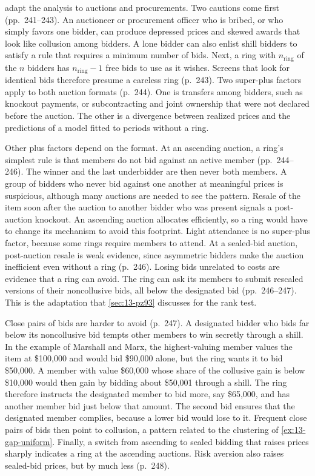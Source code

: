 \citet[ch.~12]{MarshallMarx2012} adapt the analysis to auctions and procurements. Two cautions come first
(pp.~241--243). An auctioneer or procurement officer who is bribed, or who simply favors one bidder, can produce
depressed prices and skewed awards that look like collusion among bidders. A lone bidder can also enlist shill
bidders to satisfy a rule that requires a minimum number of bids. Next, a ring with $n_{\mathrm{ring}}$ of the $n$
bidders has $n_{\mathrm{ring}} - 1$ free bids to use as it wishes. Screens that look for identical bids therefore presume a careless ring
(p.~243). Two super-plus factors apply to both auction formats (p.~244). One is transfers among bidders, such as
knockout payments, or subcontracting and joint ownership that were not declared before the auction. The other is a
divergence between realized prices and the predictions of a model fitted to periods without a ring.

Other plus factors depend on the format. At an ascending auction, a ring's simplest rule is that members do not bid
against an active member (pp.~244--246). The winner and the last underbidder are then never both members. A group of
bidders who never bid against one another at meaningful prices is suspicious, although many auctions are needed to
see the pattern. Resale of the item soon after the auction to another bidder who was present signals a post-auction
knockout. An ascending auction allocates efficiently, so a ring would have to change its mechanism to avoid this
footprint. Light attendance is no super-plus factor, because some rings require members to attend. At a
sealed-bid auction, post-auction resale is weak evidence, since asymmetric bidders make the auction inefficient
even without a ring (p.~246). Losing bids unrelated to costs are evidence that a ring can avoid. The ring can ask
its members to submit rescaled versions of their noncollusive bids, all below the designated bid (pp.~246--247).
This is the adaptation that \cref{sec:13-pz93} discusses for the rank test.

Close pairs of bids are harder to avoid (p.~247). A designated bidder who bids far below its noncollusive bid tempts
other members to win secretly through a shill. In the example of Marshall and Marx, the highest-valuing member
values the item at \$100,000 and would bid \$90,000 alone, but the ring wants it to bid \$50,000. A member with
value \$60,000 whose share of the collusive gain is below \$10,000 would then gain by bidding about \$50,001 through
a shill. The ring therefore instructs the designated member to bid more, say \$65,000, and has another member bid
just below that amount. The second bid ensures that the designated member complies, because a lower bid would lose
to it. Frequent close pairs of bids then point to collusion, a pattern related to the clustering of
\cref{ex:13-gap-uniform}. Finally, a switch from ascending to sealed bidding that raises prices sharply indicates a
ring at the ascending auctions. Risk aversion also raises sealed-bid prices, but by much less (p.~248).

